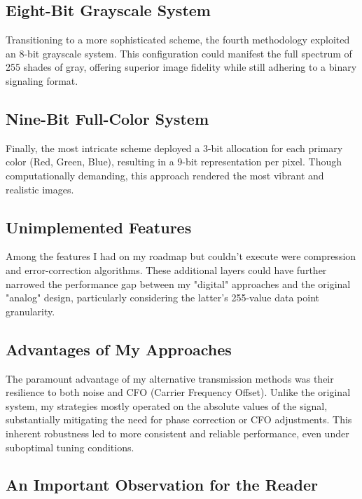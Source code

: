 \documentclass{article}
\begin{document}
\subsection*{Eight-Bit Grayscale System}

Transitioning to a more sophisticated scheme, the fourth methodology exploited an 8-bit grayscale system. This configuration could manifest the full spectrum of 255 shades of gray, offering superior image fidelity while still adhering to a binary signaling format.

\subsection*{Nine-Bit Full-Color System}

Finally, the most intricate scheme deployed a 3-bit allocation for each primary color (Red, Green, Blue), resulting in a 9-bit representation per pixel. Though computationally demanding, this approach rendered the most vibrant and realistic images.

\subsection*{Unimplemented Features}

Among the features I had on my roadmap but couldn't execute were compression and error-correction algorithms. These additional layers could have further narrowed the performance gap between my "digital" approaches and the original "analog" design, particularly considering the latter's 255-value data point granularity.

\subsection*{Advantages of My Approaches}

The paramount advantage of my alternative transmission methods was their resilience to both noise and CFO (Carrier Frequency Offset). Unlike the original system, my strategies mostly operated on the absolute values of the signal, substantially mitigating the need for phase correction or CFO adjustments. This inherent robustness led to more consistent and reliable performance, even under suboptimal tuning conditions.

\subsection*{An Important Observation for the Reader}
\end{document}
